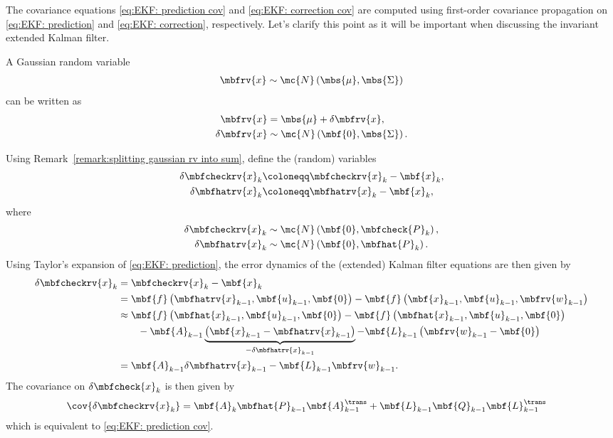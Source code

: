 \documentclass[nobib]{tufte-handout}
\begin{document}
    The covariance equations \eqref{eq:EKF: prediction cov} and \eqref{eq:EKF: correction cov} are computed using first-order covariance propagation on \eqref{eq:EKF: prediction} and \eqref{eq:EKF: correction}, respectively. Let's clarify this point as it will be important when discussing the invariant extended Kalman filter.

    \begin{remark}    
        \label{remark:splitting gaussian rv into sum}
        A Gaussian random variable 
        \begin{align}
            \mbfrv{x}\sim\mc{N}\left( \mbs{\mu}, \mbs{\Sigma} \right)
        \end{align}
        can be written as
        \begin{align}
            \mbfrv{x} &= \mbs{\mu} + \delta\mbfrv{x},\\
            \delta\mbfrv{x} &\sim \mc{N}\left( \mbf{0}, \mbs{\Sigma} \right).
        \end{align}
    \end{remark}
    Using Remark~\ref{remark:splitting gaussian rv into sum}, define the (random) variables
    \begin{align}
        \delta\mbfcheckrv{x}_{k} &\coloneqq \mbfcheckrv{x}_{k} -  \mbf{x}_{k},\\
        \delta\mbfhatrv{x}_{k} &\coloneqq \mbfhatrv{x}_{k} -  \mbf{x}_{k},
    \end{align}
    where
    \begin{align}
        \delta\mbfcheckrv{x}_{k} &\sim\mc{N}\left( \mbf{0}, \mbfcheck{P}_{k} \right),\\
        \delta\mbfhatrv{x}_{k} &\sim\mc{N}\left( \mbf{0}, \mbfhat{P}_{k} \right).
    \end{align}
    Using Taylor's expansion of \eqref{eq:EKF: prediction}, the error dynamics of the (extended) Kalman filter equations are then given by
    \begin{align}
        \delta\mbfcheckrv{x}_{k} 
        &= \mbfcheckrv{x}_{k} - \mbf{x}_{k} \\
        &= \mbf{f}\left( \mbfhatrv{x}_{k-1}, \mbf{u}_{k-1}, \mbf{0} \right) - \mbf{f}\left( \mbf{x}_{k-1}, \mbf{u}_{k-1}, \mbfrv{w}_{k-1} \right)\\
        &\approx \mbf{f}\left( \mbfhat{x}_{k-1}, \mbf{u}_{k-1}, \mbf{0} \right) - \mbf{f}\left( \mbfhat{x}_{k-1},\mbf{u}_{k-1}, \mbf{0} \right) 
            \nonumber\\&\qquad
            - \mbf{A}_{k-1}\underbrace{\left( \mbf{x}_{k-1} - \mbfhatrv{x}_{k-1} \right)}_{-\delta\mbfhatrv{x}_{k-1}} - \mbf{L}_{k-1}\left( \mbfrv{w}_{k-1} - \mbf{0} \right)\\
        &= \mbf{A}_{k-1}\delta\mbfhatrv{x}_{k-1} - \mbf{L}_{k-1}\mbfrv{w}_{k-1}.
    \end{align}
    The covariance on $\delta\mbfcheck{x}_{k}$ is then given by
    \begin{align}
        \cov{\delta\mbfcheckrv{x}_{k}} &= \mbf{A}_{k}\mbfhat{P}_{k-1}\mbf{A}_{k-1}^{\trans} + \mbf{L}_{k-1}\mbf{Q}_{k-1}\mbf{L}_{k-1}^{\trans}
    \end{align}
    which is equivalent to \eqref{eq:EKF: prediction cov}.
\end{document}

